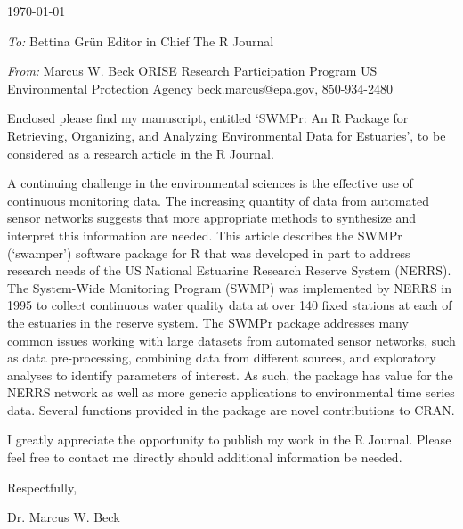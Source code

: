 \documentclass[a4paper,12pt]{article}
\begin{document}
\renewcommand{\rmdefault}{ptm}
\pagestyle{empty} 

\setlength{\parindent}{0mm} 
\setlength{\parskip}{5mm}

\begin{flushright}
\today
\end{flushright}

\emph{To:}\newline
Bettina Gr\"un\newline
Editor in Chief\newline
The R Journal

\emph{From:}\newline
Marcus W. Beck\newline
ORISE Research Participation Program\newline
US Environmental Protection Agency\newline
beck.marcus@epa.gov, 850-934-2480\vspace{0.1in}

Enclosed please find my manuscript, entitled `SWMPr: An R Package for Retrieving, Organizing, and Analyzing Environmental Data for Estuaries', to be considered as a research article in the R Journal. 

A continuing challenge in the environmental sciences is the effective use of continuous monitoring data.  The increasing quantity of data from automated sensor networks suggests that more appropriate methods to synthesize and interpret this information are needed. This article describes the SWMPr (`swamper') software package for R that was developed in part to address research needs of the US National Estuarine Research Reserve System (NERRS).  The System-Wide Monitoring Program (SWMP) was implemented by NERRS in 1995 to collect continuous water quality data at over 140 fixed stations at each of the estuaries in the reserve system.  The SWMPr package addresses many common issues working with large datasets from automated sensor networks, such as data pre-processing, combining data from different sources, and exploratory analyses to identify parameters of interest. As such, the package has value for the NERRS network as well as more generic applications to environmental time series data.  Several functions provided in the package are novel contributions to CRAN.

I greatly appreciate the opportunity to publish my work in the R Journal.  Please feel free to contact me directly should additional information be needed.

\vspace{0.1in}

\hspace{4.5in}Respectfully,

\hspace{4.5in}Dr. Marcus W. Beck
\end{document}
